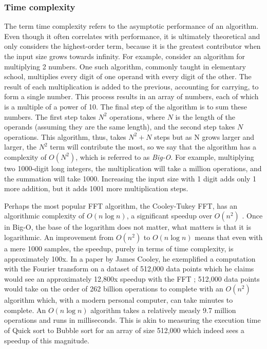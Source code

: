 \subsubsection{Time complexity}
The term time complexity refers to the asymptotic performance of an algorithm. Even though it often correlates with performance, it is ultimately theoretical and only considers the highest-order term, because it is the greatest contributor when the input size grows towards infinity. For example, consider an algorithm for multiplying 2 numbers. One such algorithm, commonly taught in elementary school, multiplies every digit of one operand with every digit of the other. The result of each multiplication is added to the previous, accounting for carrying, to form a single number. This process results in an array of numbers, each of which is a multiple of a power of 10. The final step of the algorithm is to sum these numbers. The first step takes $N^2$ operations, where $N$ is the length of the operands (assuming they are the same length), and the second step takes $N$ operations. This algorithm, thus, takes $N^2+N$ steps but as N grows larger and larger, the $N^2$ term will contribute the most, so we say that the algorithm has a complexity of $O(N^2)$, which is referred to as \textit{Big-O}. For example, multiplying two 1000-digit long integers, the multiplication will take a million operations, and the summation will take 1000. Increasing the input size with 1 digit adds only 1 more addition, but it adds 1001 more multiplication steps.

Perhaps the most popular FFT algorithm, the Cooley-Tukey FFT, has an algorithmic complexity of $O(n \log n)$, a significant speedup over $O(n^2)$ \cite{Randhawa2018}. Once in Big-O, the base of the logarithm does not matter, what matters is that it is logarithmic. An improvement from $O(n^2)$ to $O(n \log n)$ means that even with a mere 1000 samples, the speedup, purely in terms of time complexity, is approximately 100x. In a paper by James Cooley, he exemplified a computation with the Fourier transform on a dataset of 512,000 data points which he claims would see an approximately 12,800x speedup with the FFT \cite{Cooley1987}; 512,000 data points would take on the order of 262 billion operations to complete with an $O(n^2)$ algorithm which, with a modern personal computer, can take minutes to complete. An $O(n \log n)$ algorithm takes a relatively measly 9.7 million operations and runs in milliseconds. This is akin to measuring the execution time of Quick sort to Bubble sort for an array of size 512,000 which indeed sees a speedup of this magnitude.

